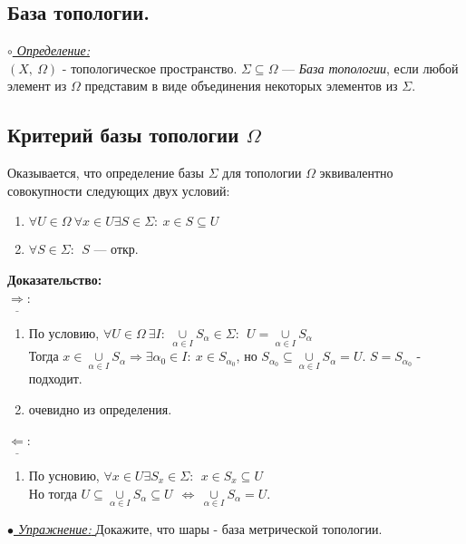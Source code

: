\documentclass{article}
\begin{document}
\begin{spacing}{1.5}
\section{База топологии.}
\underline{\textit{$\circ$ Определение:}}\\
$(X,~\Omega)$ - топологическое пространство.
$\Sigma\subseteq\Omega$ --- \emph{База топологии}, если любой элемент из $\Omega$ представим в виде объединения некоторых элементов из $\Sigma$.
\subsection{Критерий базы топологии $\Omega$}
Оказывается, что определение базы $\Sigma$ для топологии $\Omega$ эквивалентно совокупности следующих двух условий:
\begin{enumerate}
\item $\forall U\in\Omega~\forall x\in U \exists S\in \Sigma:~x\in S\subseteq U$
\item $\forall S\in \Sigma:~~ S$ --- откр.
\end{enumerate}
\textbf{Доказательство:}\\
$\underline{\Rightarrow}$: 
\begin{enumerate}
\item По условию, $\forall U\in \Omega~\exists I:~\underset{\alpha\in I}{\cup}S_{\alpha}\in \Sigma:~~U=\underset{\alpha\in I}{\cup}S_{\alpha}$
\\ Тогда $x\in \underset{\alpha\in I}{\cup}S_{\alpha}\Longrightarrow \exists\alpha_{0}\in I:~x\in S_{\alpha_{0}}$, но $S_{\alpha_{0}}\subseteq\underset{\alpha\in I}{\cup}S_{\alpha}=U$. $S = S_{\alpha_{0}}$ - подходит.
\item очевидно из определения.
\end{enumerate}
$\underline{\Leftarrow}$: \begin{enumerate}
\item[]По усновию, $\forall x\in U \exists S_{x}\in\Sigma:~~x\in S_{x}\subseteq U$
\\Но тогда $U\subseteq\underset{\alpha\in I}{\cup}S_{\alpha}\subseteq U~~\Longleftrightarrow~\underset{\alpha\in I}{\cup}S_{\alpha}=U$.
\end{enumerate}
 \underline{\emph{$\bullet$ Упражнение: }} Докажите, что шары - база метрической топологии.

\end{spacing}
\end{document}
